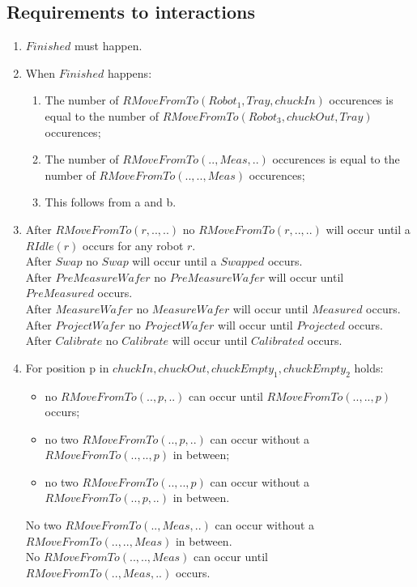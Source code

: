 \subsection{Requirements to interactions}

\begin{enumerate}
	\item $Finished$ must happen.
	\item When $Finished$ happens:
	\begin{enumerate}
	\item The number of $RMoveFromTo(Robot_1, Tray, chuckIn)$ occurences is equal to the number of $RMoveFromTo(Robot_3, chuckOut, Tray)$ occurences;
	\item The number of $RMoveFromTo(..,Meas,..)$ occurences is equal to the number of $RMoveFromTo(..,..,Meas)$ occurences;
	\item This follows from a and b.
	\end{enumerate}
	\item After $RMoveFromTo(r, .., ..)$ no $RMoveFromTo(r, .., ..)$ will occur until a $RIdle(r)$ occurs for any robot $r$.\\After $Swap$ no $Swap$ will occur until a $Swapped$ occurs.\\After $PreMeasureWafer$ no $PreMeasureWafer$ will occur until $PreMeasured$ occurs.\\After $MeasureWafer$ no $MeasureWafer$ will occur until $Measured$ occurs.\\After $ProjectWafer$ no $ProjectWafer$ will occur until $Projected$ occurs.\\After $Calibrate$ no $Calibrate$ will occur until $Calibrated$ occurs.
	\item For position p in $chuckIn, chuckOut, chuckEmpty_1, chuckEmpty_2$ holds:
		\begin{itemize}
			\item no $RMoveFromTo(.., p, ..)$ can occur until $RMoveFromTo(.., .., p)$ occurs;
			\item no two $RMoveFromTo(.., p, ..)$ can occur without a $RMoveFromTo(.., .., p)$ in between;
			\item no two $RMoveFromTo(..,..,p)$ can occur without a $RMoveFromTo(..,p,..)$ in between.
		\end{itemize}
	No two $RMoveFromTo(..,Meas,..)$ can occur without a $RMoveFromTo(..,..,Meas)$ in between.\\
	No $RMoveFromTo(..,..,Meas)$ can occur until $RMoveFromTo(..,Meas,..)$ occurs.\\

\end{enumerate}

